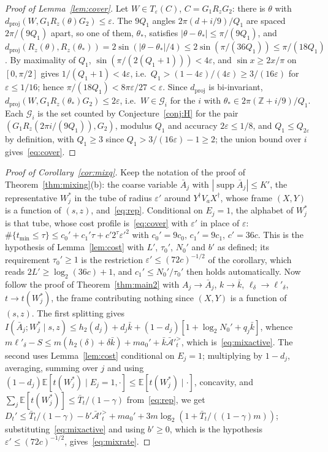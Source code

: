 \documentclass[aps,prx,twocolumn,superscriptaddress,nofootinbib,longbibliography]{revtex4-2}
\theoremstyle{plain}
\theoremstyle{definition}
\theoremstyle{remark}
\newcommand{\dproj}{d_{\mathrm{proj}}}
\newcommand{\E}{\mathbb{E}}
\newcommand{\Z}{\mathbb{Z}}
\newcommand{\supp}{\operatorname{supp}}
\begin{document}
\begin{proof}[Proof of Lemma~\ref{lem:cover}]
Let $W\in T_\varepsilon(C)$, $C=G_1R_zG_2$: there is $\theta$ with $\dproj(W,G_1R_z(\theta)G_2)\le\varepsilon$. The $9Q_1$ angles $2\pi(d+i/9)/Q_1$ are spaced $2\pi/(9Q_1)$ apart, so one of them, $\theta_*$, satisfies $|\theta-\theta_*|\le\pi/(9Q_1)$, and $\dproj(R_z(\theta),R_z(\theta_*))=2\sin(|\theta-\theta_*|/4)\le2\sin(\pi/(36Q_1))\le\pi/(18Q_1)$. By maximality of $Q_1$, $\sin(\pi/(2(Q_1+1)))<4\varepsilon$, and $\sin x\ge2x/\pi$ on $[0,\pi/2]$ gives $1/(Q_1+1)<4\varepsilon$, i.e.\ $Q_1>(1-4\varepsilon)/(4\varepsilon)\ge3/(16\varepsilon)$ for $\varepsilon\le1/16$; hence $\pi/(18Q_1)<8\pi\varepsilon/27<\varepsilon$. Since $\dproj$ is bi-invariant, $\dproj(W,G_1R_z(\theta_*)G_2)\le2\varepsilon$, i.e.\ $W\in\mathcal G_i$ for the $i$ with $\theta_*\in2\pi(\Z+i/9)/Q_1$. Each $\mathcal G_i$ is the set counted by Conjecture~\ref{conj:H} for the pair $(G_1R_z(2\pi i/(9Q_1)),G_2)$, modulus $Q_1$ and accuracy $2\varepsilon\le1/8$, and $Q_1\le Q_{2\varepsilon}$ by definition, with $Q_1\ge3$ since $Q_1>3/(16\varepsilon)-1\ge2$; the union bound over $i$ gives~\eqref{eq:cover}.
\end{proof}

\begin{proof}[Proof of Corollary~\ref{cor:mixq}]
Keep the notation of the proof of Theorem~\ref{thm:mixing}(b): the coarse variable $\bar A_j$ with $|\supp\bar A_j|\le K'$, the representative $W^*_j$ in the tube of radius $\varepsilon'$ around $Y^\dagger V_aX^\dagger$, whose frame $(X,Y)$ is a function of $(s,z)$, and~\eqref{eq:rep}. Conditional on $E_j=1$, the alphabet of $W^*_j$ is that tube, whose cost profile is~\eqref{eq:cover} with $\varepsilon'$ in place of $\varepsilon$: $\#\{t_{\min}\le\tau\}\le c_0'+c_1'\tau+c'2^\tau\varepsilon'^2$ with $c_0'=9c_0$, $c_1'=9c_1$, $c'=36c$. This is the hypothesis of Lemma~\ref{lem:cost} with $L'$, $\tau_0'$, $N_0'$ and $b'$ as defined; its requirement $\tau_0'\ge1$ is the restriction $\varepsilon'\le(72c)^{-1/2}$ of the corollary, which reads $2L'\ge\log_2(36c)+1$, and $c_1'\le N_0'/\tau_0'$ then holds automatically. Now follow the proof of Theorem~\ref{thm:main2} with $A_j\to\bar A_j$, $k\to\bar k$, $\ell_\delta\to\ell'_\delta$, $t\to t(W^*_j)$, the frame contributing nothing since $(X,Y)$ is a function of $(s,z)$. The first splitting gives $I(\bar A_j;W^*_j\mid s,z)\le h_2(d_j)+d_j\bar k+(1-d_j)[1+\log_2N_0'+q_j\bar k]$, whence $m\ell'_\delta-S\le m(h_2(\delta)+\delta\bar k)+ma_0'+\bar k\bar{\mathcal A}'^{>}_t$, which is~\eqref{eq:mixactive}. The second uses Lemma~\ref{lem:cost} conditional on $E_j=1$; multiplying by $1-d_j$, averaging, summing over $j$ and using $(1-d_j)\E[t(W^*_j)\mid E_j=1,\cdot]\le\E[t(W^*_j)\mid\cdot]$, concavity, and $\sum_j\E[t(W^*_j)]\le\bar T_t/(1-\gamma)$ from~\eqref{eq:rep}, we get $D_t'\le\bar T_t/(1-\gamma)-b'\bar{\mathcal A}'^{>}_t+ma_0'+3m\log_2(1+\bar T_t/((1-\gamma)m))$; substituting~\eqref{eq:mixactive} and using $b'\ge0$, which is the hypothesis $\varepsilon'\le(72c)^{-1/2}$, gives~\eqref{eq:mixrate}.
\end{proof}
\end{document}
